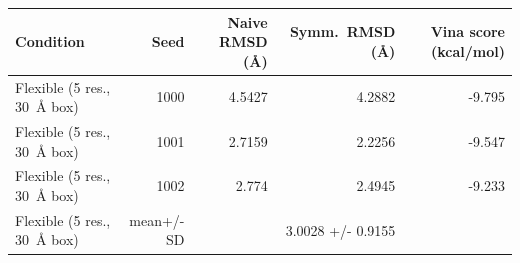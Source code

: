 \begin{tabular}{lrrrr}
\toprule
Condition & Seed & Naive RMSD (\AA) & Symm.\ RMSD (\AA) & Vina score (kcal/mol) \\
\midrule
Flexible (5 res., 30~\AA{} box) & 1000 & 4.5427 & 4.2882 & -9.795 \\
Flexible (5 res., 30~\AA{} box) & 1001 & 2.7159 & 2.2256 & -9.547 \\
Flexible (5 res., 30~\AA{} box) & 1002 & 2.774 & 2.4945 & -9.233 \\
Flexible (5 res., 30~\AA{} box) & mean+/-SD &  & 3.0028 +/- 0.9155 &  \\
\bottomrule
\end{tabular}
